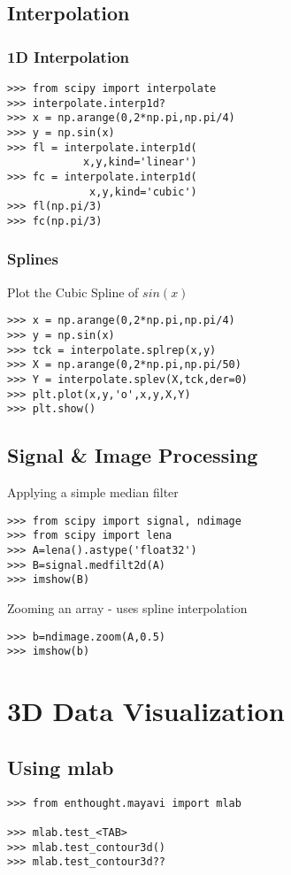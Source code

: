 \documentclass[12pt]{article}
\begin{document}
\subsection{Interpolation}
\subsubsection{1D Interpolation}
\begin{verbatim}
>>> from scipy import interpolate
>>> interpolate.interp1d?
>>> x = np.arange(0,2*np.pi,np.pi/4)
>>> y = np.sin(x)
>>> fl = interpolate.interp1d(
            x,y,kind='linear')
>>> fc = interpolate.interp1d(
             x,y,kind='cubic')
>>> fl(np.pi/3)
>>> fc(np.pi/3)
\end{verbatim}

\subsubsection{Splines}
Plot the Cubic Spline of $sin(x)$
\begin{verbatim}
>>> x = np.arange(0,2*np.pi,np.pi/4)
>>> y = np.sin(x)
>>> tck = interpolate.splrep(x,y)
>>> X = np.arange(0,2*np.pi,np.pi/50)
>>> Y = interpolate.splev(X,tck,der=0)
>>> plt.plot(x,y,'o',x,y,X,Y)
>>> plt.show()
\end{verbatim}

\subsection{Signal \& Image Processing}
Applying a simple median filter
\begin{verbatim}
>>> from scipy import signal, ndimage
>>> from scipy import lena
>>> A=lena().astype('float32')
>>> B=signal.medfilt2d(A)
>>> imshow(B)
\end{verbatim}
Zooming an array - uses spline interpolation
\begin{verbatim}
>>> b=ndimage.zoom(A,0.5)
>>> imshow(b)
\end{verbatim}

\section{3D Data Visualization}
\subsection{Using mlab}
\begin{verbatim}
>>> from enthought.mayavi import mlab

>>> mlab.test_<TAB>
>>> mlab.test_contour3d()
>>> mlab.test_contour3d??
\end{verbatim}
\end{document}
